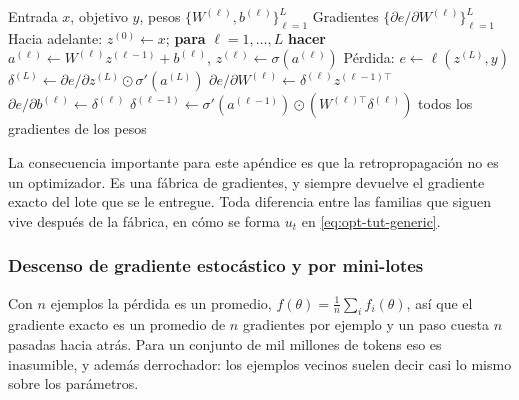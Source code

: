 \begin{algorithm}[H]
\caption{Retropropagación: la fábrica del gradiente}
\label{alg:opt-tut-backprop}
\begin{algorithmic}[1]
\Require Entrada $x$, objetivo $y$, pesos $\{W^{(\ell)},b^{(\ell)}\}_{\ell=1}^{L}$
\Ensure Gradientes $\{\partial e/\partial W^{(\ell)}\}_{\ell=1}^{L}$
\State Hacia adelante: $z^{(0)}\gets x$; \textbf{para} $\ell=1,\dots,L$ \textbf{hacer} $a^{(\ell)}\gets W^{(\ell)}z^{(\ell-1)}+b^{(\ell)}$, $z^{(\ell)}\gets\sigma(a^{(\ell)})$
\State Pérdida: $e \gets \ell(z^{(L)}, y)$
\State $\delta^{(L)} \gets \partial e/\partial z^{(L)} \odot \sigma'(a^{(L)})$
    \State $\partial e/\partial W^{(\ell)} \gets \delta^{(\ell)} z^{(\ell-1)\top}$
    \State $\partial e/\partial b^{(\ell)} \gets \delta^{(\ell)}$
    \State $\delta^{(\ell-1)} \gets \sigma'(a^{(\ell-1)})\odot\left(W^{(\ell)\top}\delta^{(\ell)}\right)$
\EndFor
\State \Return todos los gradientes de los pesos
\end{algorithmic}
\end{algorithm}

La consecuencia importante para este apéndice es que la retropropagación no es
un optimizador. Es una fábrica de gradientes, y siempre devuelve el gradiente
exacto del lote que se le entregue. Toda diferencia entre las familias que
siguen vive después de la fábrica, en cómo se forma $u_t$ en
\eqref{eq:opt-tut-generic}.

\subsubsection{Descenso de gradiente estocástico y por mini-lotes}
\label{sec:opt-tutorial-sgd}

Con $n$ ejemplos la pérdida es un promedio, $f(\theta)=\frac1n\sum_i f_i(\theta)$,
así que el gradiente exacto es un promedio de $n$ gradientes por ejemplo y un
paso cuesta $n$ pasadas hacia atrás. Para un conjunto de mil millones de tokens
eso es inasumible, y además derrochador: los ejemplos vecinos suelen decir casi
lo mismo sobre los parámetros.

